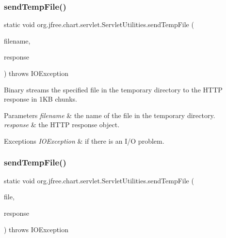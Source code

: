 \subsubsection{\texorpdfstring{send\+Temp\+File()}{sendTempFile()}\hspace{0.1cm}{\footnotesize\ttfamily [1/3]}}
{\footnotesize\ttfamily static void org.\+jfree.\+chart.\+servlet.\+Servlet\+Utilities.\+send\+Temp\+File (\begin{DoxyParamCaption}\item[{String}]{filename,  }\item[{Http\+Servlet\+Response}]{response }\end{DoxyParamCaption}) throws I\+O\+Exception\hspace{0.3cm}{\ttfamily [static]}}

Binary streams the specified file in the temporary directory to the H\+T\+TP response in 1\+KB chunks.


\begin{DoxyParams}{Parameters}
{\em filename} & the name of the file in the temporary directory. \\
\hline
{\em response} & the H\+T\+TP response object.\\
\hline
\end{DoxyParams}

\begin{DoxyExceptions}{Exceptions}
{\em I\+O\+Exception} & if there is an I/O problem. \\
\hline
\end{DoxyExceptions}
\mbox{\label{classorg_1_1jfree_1_1chart_1_1servlet_1_1_servlet_utilities_aad824441b81a28733dad262670f62efe}} 
\subsubsection{\texorpdfstring{send\+Temp\+File()}{sendTempFile()}\hspace{0.1cm}{\footnotesize\ttfamily [2/3]}}
{\footnotesize\ttfamily static void org.\+jfree.\+chart.\+servlet.\+Servlet\+Utilities.\+send\+Temp\+File (\begin{DoxyParamCaption}\item[{File}]{file,  }\item[{Http\+Servlet\+Response}]{response }\end{DoxyParamCaption}) throws I\+O\+Exception\hspace{0.3cm}{\ttfamily [static]}}

